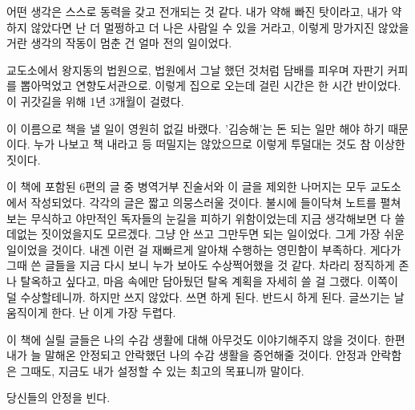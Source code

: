 \begin{article}
어떤 생각은 스스로 동력을 갖고 전개되는 것 같다. 내가 약해 빠진 탓이라고, 내가 약하지 않았다면 난 더 멀쩡하고 더 나은 사람일 수 있을 거라고, 이렇게 망가지진 않았을 거란 생각의 작동이 멈춘 건 얼마 전의 일이었다.

교도소에서 왕지동의 법원으로, 법원에서 그날 했던 것처럼 담배를 피우며 자판기 커피를 뽑아먹었고 연향도서관으로. 이렇게 집으로 오는데 걸린 시간은 한 시간 반이었다. 이 귀갓길을 위해 1년 3개월이 걸렸다.

이 이름으로 책을 낼 일이 영원히 없길 바랬다. '김승해'는 돈 되는 일만 해야 하기 때문이다. 누가 나보고 책 내라고 등 떠밀지는 않았으므로 이렇게 투덜대는 것도 참 이상한 짓이다.

이 책에 포함된 6편의 글 중 병역거부 진술서와 이 글을 제외한 나머지는 모두 교도소에서 작성되었다. 각각의 글은 짧고 의뭉스러울 것이다. 불시에 들이닥쳐 노트를 펼쳐보는 무식하고 야만적인 독자들의 눈길을 피하기 위함이었는데 지금 생각해보면 다 쓸데없는 짓이었을지도 모르겠다. 그냥 안 쓰고 그만두면 되는 일이었다. 그게 가장 쉬운 일이었을 것이다. 내겐 이런 걸 재빠르게 알아채 수행하는 영민함이 부족하다. 게다가 그때 쓴 글들을 지금 다시 보니 누가 보아도 수상쩍어했을 것 같다. 차라리 정직하게 존나 탈옥하고 싶다고, 마음 속에만 담아뒀던 탈옥 계획을 자세히 쓸 걸 그랬다. 이쪽이 덜 수상할테니까. 하지만 쓰지 않았다. 쓰면 하게 된다. 반드시 하게 된다. 글쓰기는 날 움직이게 한다. 난 이게 가장 두렵다.

이 책에 실릴 글들은 나의 수감 생활에 대해 아무것도 이야기해주지 않을 것이다. 한편 내가 늘 말해온 안정되고 안락했던 나의 수감 생활을 증언해줄 것이다. 안정과 안락함은 그때도, 지금도 내가 설정할 수 있는 최고의 목표니까 말이다.

당신들의 안정을 빈다.
\end{article}

